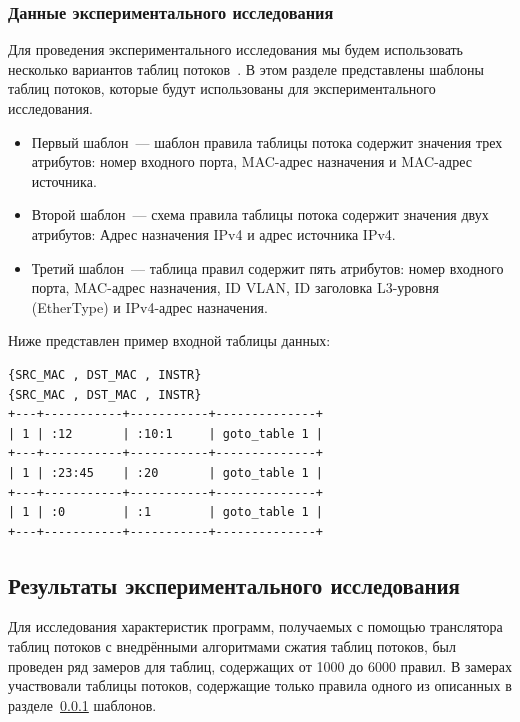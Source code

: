 \documentclass[oneside,final,12pt]{extarticle}
\begin{document}
            \subsubsection{Данные экспериментального исследования}
                \label{sect:input_data}
                Для проведения экспериментального исследования мы будем использовать несколько вариантов таблиц потоков~\cite{braun2014wildcard}. 
                В этом разделе представлены шаблоны таблиц потоков, которые будут использованы для экспериментального исследования.
                \begin{itemize}
                    \item Первый шаблон~--- шаблон правила таблицы потока содержит значения трех атрибутов: номер входного порта, MAC-адрес назначения и MAC-адрес источника.
                    \item Второй шаблон~--- схема правила таблицы потока содержит значения двух атрибутов: Адрес назначения IPv4 и адрес источника IPv4.
                    \item Третий шаблон~--- таблица правил содержит пять атрибутов: номер входного порта, MAC-адрес назначения, ID VLAN, ID заголовка L3-уровня (EtherType) и IPv4-адрес назначения.
                \end{itemize}
                Ниже представлен пример входной таблицы данных:
\lstset{numbers=none}
\begin{lstlisting}
{SRC_MAC , DST_MAC , INSTR}
{SRC_MAC , DST_MAC , INSTR}
+---+-----------+-----------+--------------+
| 1 | :12       | :10:1     | goto_table 1 |
+---+-----------+-----------+--------------+
| 1 | :23:45    | :20       | goto_table 1 |
+---+-----------+-----------+--------------+
| 1 | :0        | :1        | goto_table 1 |
+---+-----------+-----------+--------------+
\end{lstlisting}
\lstset{numbers=left}
                
        \subsection{Результаты экспериментального исследования}
            Для исследования характеристик программ, получаемых с помощью транслятора 
            таблиц потоков с внедрёнными алгоритмами сжатия таблиц потоков, 
            был проведен ряд замеров для таблиц, содержащих от 1000 до 6000 правил. 
            В замерах участвовали таблицы потоков, содержащие только правила одного 
            из описанных в разделе~\ref{sect:input_data} шаблонов.
\end{document}
